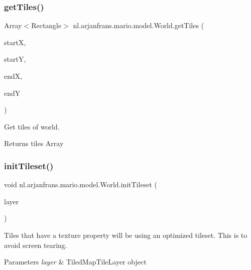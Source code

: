 \subsubsection{\texorpdfstring{get\+Tiles()}{getTiles()}}
{\footnotesize\ttfamily Array$<$Rectangle$>$ nl.\+arjanfrans.\+mario.\+model.\+World.\+get\+Tiles (\begin{DoxyParamCaption}\item[{int}]{startX,  }\item[{int}]{startY,  }\item[{int}]{endX,  }\item[{int}]{endY }\end{DoxyParamCaption})}



Get tiles of world. 

\begin{DoxyReturn}{Returns}
tiles Array 
\end{DoxyReturn}
\mbox{\label{classnl_1_1arjanfrans_1_1mario_1_1model_1_1World_a660856f043c0ecd47c4dd256c3816512}} 
\subsubsection{\texorpdfstring{init\+Tileset()}{initTileset()}}
{\footnotesize\ttfamily void nl.\+arjanfrans.\+mario.\+model.\+World.\+init\+Tileset (\begin{DoxyParamCaption}\item[{Tiled\+Map\+Tile\+Layer}]{layer }\end{DoxyParamCaption})\hspace{0.3cm}{\ttfamily [private]}}

Tiles that have a \textquotesingle{}texture\textquotesingle{} property will be using an optimized tileset. This is to avoid screen tearing. 
\begin{DoxyParams}{Parameters}
{\em layer} & Tiled\+Map\+Tile\+Layer object \\
\hline
\end{DoxyParams}
\mbox{\label{classnl_1_1arjanfrans_1_1mario_1_1model_1_1World_a6dfa1226bc95fa7ad434f7f14b96e527}} 
